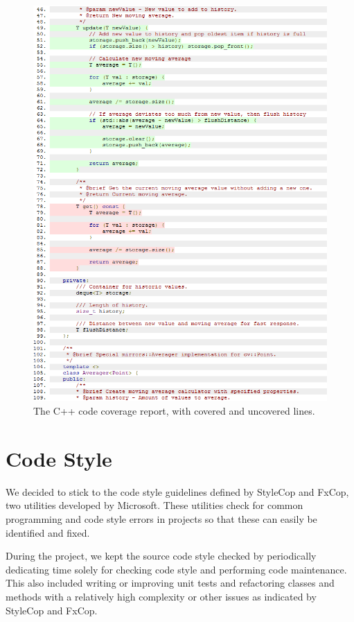             \begin{figure}[!ht]
                \centering
                \includegraphics[scale = 0.5]{CPPCoverageLines}
                \caption{The C++ code coverage report, with covered and uncovered lines.}
                \label{fig:cpplines}
            \end{figure}
            
    \section{Code Style} \label{sec:codestyle}
        We decided to stick to the code style guidelines defined by StyleCop and 
        FxCop, two utilities developed by Microsoft. These utilities check for 
        common programming and code style errors in projects so that these can 
        easily be identified and fixed. 
        
        During the project, we kept the source code style checked by periodically
        dedicating time solely for checking code style and performing code 
        maintenance. This also included writing or improving unit tests and 
        refactoring classes and methods with a relatively high complexity or other 
        issues as indicated by StyleCop and FxCop.
        
